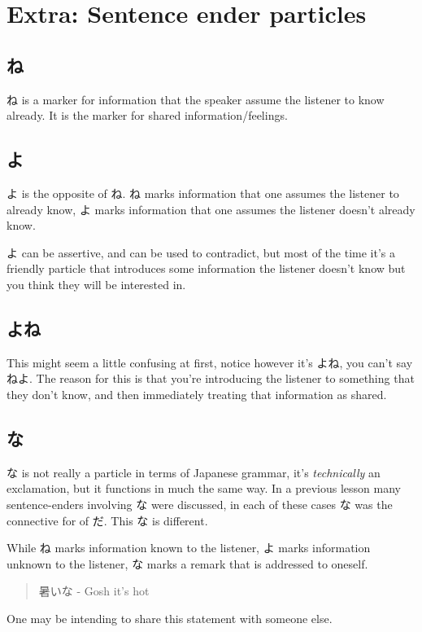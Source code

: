 \documentclass[11pt]{article}
\begin{document}
\section{Extra: Sentence ender particles}
\label{sec:org31f0de4}
\subsection{ね}
\label{sec:orge9325ec}
ね is a marker for information that the speaker assume the listener to know already. It is the marker for shared information/feelings.

\subsection{よ}
\label{sec:orgef97488}
よ is the opposite of ね. ね marks information that one assumes the listener to already know, よ marks information that one assumes the listener doesn't already know.

よ can be assertive, and can be used to contradict, but most of the time it's a friendly particle that introduces some information the listener doesn't know but you think they will be interested in.

\subsection{よね}
\label{sec:org1f10e27}
This might seem a little confusing at first, notice however it's よね, you can't say ねよ. The reason for this is that you're introducing the listener to something that they don't know, and then immediately treating that information as shared.

\subsection{な}
\label{sec:org5ad4e88}
な is not really a particle in terms of Japanese grammar, it's \emph{technically} an exclamation, but it functions in much the same way. In a previous lesson many sentence-enders involving な were discussed, in each of these cases な was the connective for of だ. This な is different.

While ね marks information known to the listener, よ marks information unknown to the listener, な marks a remark that is addressed to oneself.
\begin{quote}
暑いな - Gosh it's hot
\end{quote}
One may be intending to share this statement with someone else.
\end{document}
